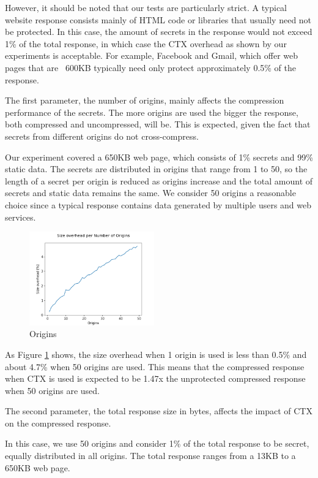 However, it should be noted that our tests are particularly strict. A typical
website response consists mainly of HTML code or libraries that usually need not
be protected. In this case, the amount of secrets in the response would not
exceed 1\% of the total response, in which case the CTX overhead as shown by our
experiments is acceptable. For example, Facebook and Gmail, which offer web
pages that are ~600KB typically need only protect approximately 0.5\% of the
response.

The first parameter, the number of origins, mainly affects the compression
performance of the secrets. The more origins are used the bigger the response,
both compressed and uncompressed, will be. This is expected, given the fact that
secrets from different origins do not cross-compress.

Our experiment covered a 650KB web page, which consists of 1\% secrets and 99\%
static data. The secrets are distributed in origins that range from 1 to 50, so
the length of a secret per origin is reduced as origins increase and the total
amount of secrets and static data remains the same. We consider 50 origins a
reasonable choice since a typical response contains data generated by multiple
users and web services.

    \begin{figure}[thpb]
        \centering
            \includegraphics[width=0.48\textwidth]{experiments/origins.png}
        \caption{Origins}
        \label{fig:origin_ctx}
    \end{figure}

As Figure \ref{fig:origin_ctx} shows, the size overhead when 1 origin is used is less than 0.5\%
and about 4.7\% when 50 origins are used. This means that the compressed
response when CTX is used is expected to be 1.47x the unprotected compressed
response when 50 origins are used.

The second parameter, the total response size in bytes, affects the impact of
CTX on the compressed response.

In this case, we use 50 origins and consider 1\% of the total response to be
secret, equally distributed in all origins. The total response ranges from a
13KB to a 650KB web page.

